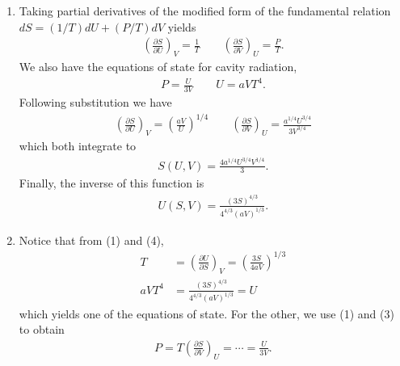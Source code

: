 \documentclass[a4paper,12pt]{article}
\begin{document}
\begin{enumerate}[label=\textbf{[\arabic*]}]
    \item
        \begin{enumerate}
            \item
                Taking partial derivatives of the modified form of the fundamental relation $dS = (1/T)dU + (P/T)dV$ yields
                \begin{align}
                    \left( \frac{\partial S}{\partial U} \right)_V = \frac{1}{T} \qquad \left( \frac{\partial S}{\partial V} \right)_U = \frac{P}{T}.
                \end{align}
                We also have the equations of state for cavity radiation,
                \begin{align}
                    P = \frac{U}{3V} \qquad U = aVT^4.
                \end{align}
                Following substitution we have
                \begin{align*}
                    \left( \frac{\partial S}{\partial U} \right)_V = \left( \frac{aV}{U} \right)^{1/4} \qquad \left( \frac{\partial S}{\partial V} \right)_U = \frac{a^{1/4} U^{3/4}}{3V^{3/4}}
                \end{align*}
                which both integrate to
                \begin{align}
                    S(U, V) = \frac{4a^{1/4}U^{3/4}V^{1/4}}{3}.
                \end{align}
                Finally, the inverse of this function is
                \begin{align}
                    U(S, V) = \frac{(3S)^{4/3}}{4^{4/3} (aV)^{1/3}}.
                \end{align}

            \item
                Notice that from (1) and (4),
                \begin{align}
                    T &= \left( \frac{\partial U}{\partial S} \right)_V = \left( \frac{3S}{4aV} \right)^{1/3} \\
                    aVT^4 &= \frac{(3S)^{4/3}}{4^{4/3} (aV)^{1/3}} = U
                \end{align}
                which yields one of the equations of state. For the other, we use (1) and (3) to obtain
                \begin{align*}
                    P = T \left( \frac{\partial S}{\partial V} \right)_U = \cdots = \frac{U}{3V}.
                \end{align*}


\end{enumerate}
\end{enumerate}
\end{document}
